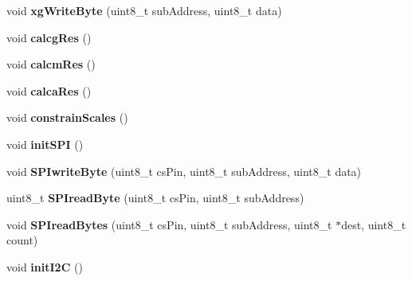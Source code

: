\begin{DoxyCompactItemize}
\item 
void {\bfseries xg\+Write\+Byte} (uint8\+\_\+t sub\+Address, uint8\+\_\+t data)\hypertarget{classLSM9DS1_a263eed4b52ad087a1195755c6ba49e62}{}\label{classLSM9DS1_a263eed4b52ad087a1195755c6ba49e62}

\item 
void {\bfseries calcg\+Res} ()\hypertarget{classLSM9DS1_a303e0dd33e000579dc3917aecedb6e63}{}\label{classLSM9DS1_a303e0dd33e000579dc3917aecedb6e63}

\item 
void {\bfseries calcm\+Res} ()\hypertarget{classLSM9DS1_a830dfc95c7e2d8524720d78357b053cb}{}\label{classLSM9DS1_a830dfc95c7e2d8524720d78357b053cb}

\item 
void {\bfseries calca\+Res} ()\hypertarget{classLSM9DS1_a31597c9ae6c5a7de64a50cbbbcd24297}{}\label{classLSM9DS1_a31597c9ae6c5a7de64a50cbbbcd24297}

\item 
void {\bfseries constrain\+Scales} ()\hypertarget{classLSM9DS1_a5aadcd09cf9157de817c359e49304ca7}{}\label{classLSM9DS1_a5aadcd09cf9157de817c359e49304ca7}

\item 
void {\bfseries init\+S\+PI} ()\hypertarget{classLSM9DS1_a4286d5803ab028c657e007ae99acc60a}{}\label{classLSM9DS1_a4286d5803ab028c657e007ae99acc60a}

\item 
void {\bfseries S\+P\+Iwrite\+Byte} (uint8\+\_\+t cs\+Pin, uint8\+\_\+t sub\+Address, uint8\+\_\+t data)\hypertarget{classLSM9DS1_a83321c9d6ec50f6b9944907d2be482cd}{}\label{classLSM9DS1_a83321c9d6ec50f6b9944907d2be482cd}

\item 
uint8\+\_\+t {\bfseries S\+P\+Iread\+Byte} (uint8\+\_\+t cs\+Pin, uint8\+\_\+t sub\+Address)\hypertarget{classLSM9DS1_a6f0f50bb5e9b702d5a19c7441a3f9d8b}{}\label{classLSM9DS1_a6f0f50bb5e9b702d5a19c7441a3f9d8b}

\item 
void {\bfseries S\+P\+Iread\+Bytes} (uint8\+\_\+t cs\+Pin, uint8\+\_\+t sub\+Address, uint8\+\_\+t $\ast$dest, uint8\+\_\+t count)\hypertarget{classLSM9DS1_a26c0f164454eba84e6486033b7061d11}{}\label{classLSM9DS1_a26c0f164454eba84e6486033b7061d11}

\item 
void {\bfseries init\+I2C} ()\hypertarget{classLSM9DS1_ae60332c2836bd3f19846b7a44c015ddd}{}\label{classLSM9DS1_ae60332c2836bd3f19846b7a44c015ddd}


\end{DoxyCompactItemize}
